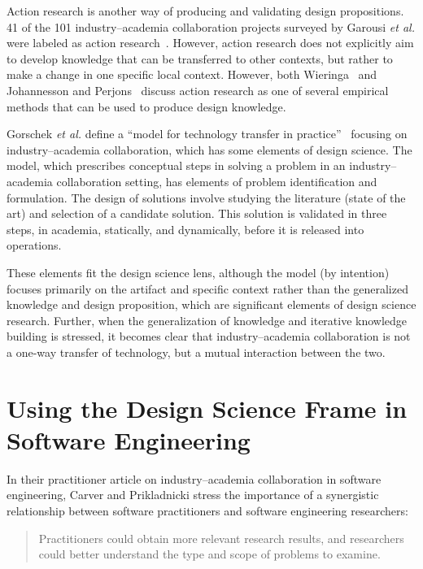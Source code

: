 \documentclass[graybox]{svmult}
\begin{document}
Action research is another way of producing and validating design propositions.  41 of the 101 industry--academia collaboration projects surveyed by Garousi \emph{et al.} were labeled as action research~\cite{Garousi2019}. However, action research does not explicitly aim to develop knowledge that can be transferred to other contexts, but rather to make a change in one specific local context. However, both Wieringa~\cite{wieringa_technical_2012} and Johannesson and Perjons~\cite{johannesson_introduction_2014} discuss action research as one of several empirical methods that can be used to produce design knowledge.


Gorschek \emph{et al.} define a ``model for technology transfer in practice''~\cite{GorschekSW2006} focusing on industry--academia collaboration, which has some elements of design science. The model, which prescribes conceptual steps in solving a problem in an industry--academia collaboration setting, has elements of problem identification and formulation. The design of solutions involve studying the literature (state of the art) and selection of a candidate solution. This solution is validated in three steps, in academia, statically, and dynamically, before it is released into operations. 

These elements fit the design science lens, although the model (by intention) focuses primarily on the artifact and specific context rather than the generalized knowledge and design proposition, which are significant elements of design science research. Further, when the generalization of knowledge and iterative knowledge building is stressed, it becomes clear that industry--academia collaboration is not a one-way transfer of technology, but a mutual interaction between the two.


\section{Using the Design Science Frame in Software Engineering}
\label{sec:UsingDSinSE}

In their practitioner article on industry--academia collaboration in software engineering, Carver and Prikladnicki stress the importance of a synergistic relationship between software practitioners and software engineering researchers:
\begin{quote}Practitioners could obtain more relevant research results, and researchers could better understand the type and scope of problems to examine.~\cite{CarverIEEESW2018}
\end{quote} 
\end{document}
